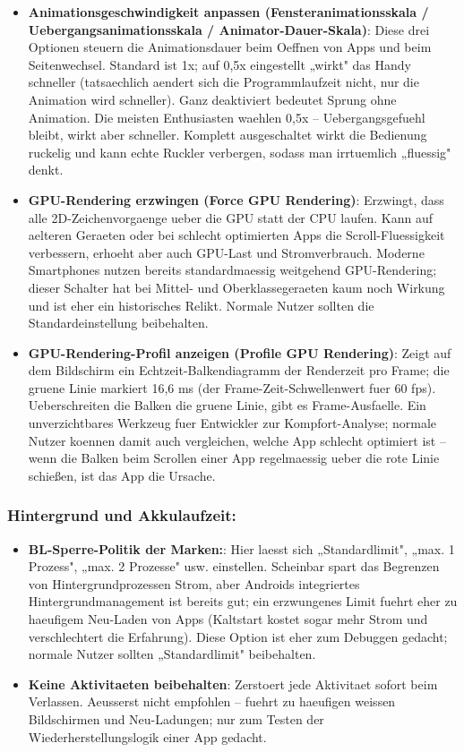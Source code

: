 \begin{itemize}
  \item \textbf{Animationsgeschwindigkeit anpassen (Fensteranimationsskala / Uebergangsanimationsskala / Animator-Dauer-Skala)}: Diese drei Optionen steuern die Animationsdauer beim Oeffnen von Apps und beim Seitenwechsel. Standard ist 1x; auf 0,5x eingestellt „wirkt" das Handy schneller (tatsaechlich aendert sich die Programmlaufzeit nicht, nur die Animation wird schneller). Ganz deaktiviert bedeutet Sprung ohne Animation. Die meisten Enthusiasten waehlen 0,5x – Uebergangsgefuehl bleibt, wirkt aber schneller. Komplett ausgeschaltet wirkt die Bedienung ruckelig und kann echte Ruckler verbergen, sodass man irrtuemlich „fluessig" denkt.
  \item \textbf{GPU-Rendering erzwingen (Force GPU Rendering)}: Erzwingt, dass alle 2D-Zeichenvorgaenge ueber die GPU statt der CPU laufen. Kann auf aelteren Geraeten oder bei schlecht optimierten Apps die Scroll-Fluessigkeit verbessern, erhoeht aber auch GPU-Last und Stromverbrauch. Moderne Smartphones nutzen bereits standardmaessig weitgehend GPU-Rendering; dieser Schalter hat bei Mittel- und Oberklassegeraeten kaum noch Wirkung und ist eher ein historisches Relikt. Normale Nutzer sollten die Standardeinstellung beibehalten.
  \item \textbf{GPU-Rendering-Profil anzeigen (Profile GPU Rendering)}: Zeigt auf dem Bildschirm ein Echtzeit-Balkendiagramm der Renderzeit pro Frame; die gruene Linie markiert 16,6 ms (der Frame-Zeit-Schwellenwert fuer 60 fps). Ueberschreiten die Balken die gruene Linie, gibt es Frame-Ausfaelle. Ein unverzichtbares Werkzeug fuer Entwickler zur Kompfort-Analyse; normale Nutzer koennen damit auch vergleichen, welche App schlecht optimiert ist – wenn die Balken beim Scrollen einer App regelmaessig ueber die rote Linie schießen, ist das App die Ursache.
\end{itemize}

\subsubsection*{Hintergrund und Akkulaufzeit:}

\begin{itemize}
  \item \textbf{BL-Sperre-Politik der Marken:}: Hier laesst sich „Standardlimit", „max. 1 Prozess", „max. 2 Prozesse" usw. einstellen. Scheinbar spart das Begrenzen von Hintergrundprozessen Strom, aber Androids integriertes Hintergrundmanagement ist bereits gut; ein erzwungenes Limit fuehrt eher zu haeufigem Neu-Laden von Apps (Kaltstart kostet sogar mehr Strom und verschlechtert die Erfahrung). Diese Option ist eher zum Debuggen gedacht; normale Nutzer sollten „Standardlimit" beibehalten.
  \item \textbf{Keine Aktivitaeten beibehalten}: Zerstoert jede Aktivitaet sofort beim Verlassen. Aeusserst nicht empfohlen – fuehrt zu haeufigen weissen Bildschirmen und Neu-Ladungen; nur zum Testen der Wiederherstellungslogik einer App gedacht.
\end{itemize}

